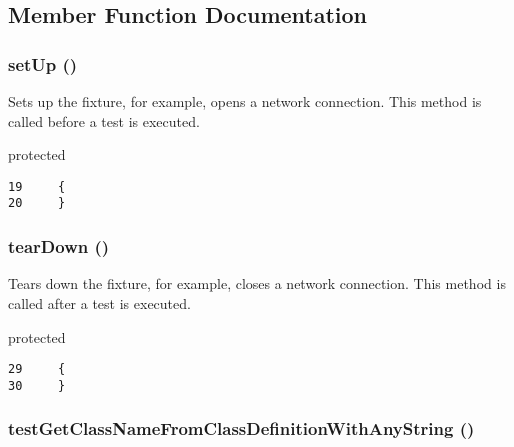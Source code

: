 \subsection{Member Function Documentation}
\hypertarget{class_coruja_class_manipulation_test_0bc688732d2b3b162ffebaf7812e78da}{
\subsubsection[{setUp}]{\setlength{\rightskip}{0pt plus 5cm}setUp ()}}
\label{class_coruja_class_manipulation_test_0bc688732d2b3b162ffebaf7812e78da}


Sets up the fixture, for example, opens a network connection. This method is called before a test is executed.

protected 

\begin{Code}\begin{verbatim}19     {
20     }
\end{verbatim}
\end{Code}


\hypertarget{class_coruja_class_manipulation_test_80fe3d17e658907fc75346a0ec9d6fc7}{
\subsubsection[{tearDown}]{\setlength{\rightskip}{0pt plus 5cm}tearDown ()}}
\label{class_coruja_class_manipulation_test_80fe3d17e658907fc75346a0ec9d6fc7}


Tears down the fixture, for example, closes a network connection. This method is called after a test is executed.

protected 

\begin{Code}\begin{verbatim}29     {
30     }
\end{verbatim}
\end{Code}


\hypertarget{class_coruja_class_manipulation_test_796ba61d6460c6e55138f1a683f17899}{
\subsubsection[{testGetClassNameFromClassDefinitionWithAnyString}]{\setlength{\rightskip}{0pt plus 5cm}testGetClassNameFromClassDefinitionWithAnyString ()}}
\label{class_coruja_class_manipulation_test_796ba61d6460c6e55138f1a683f17899}


